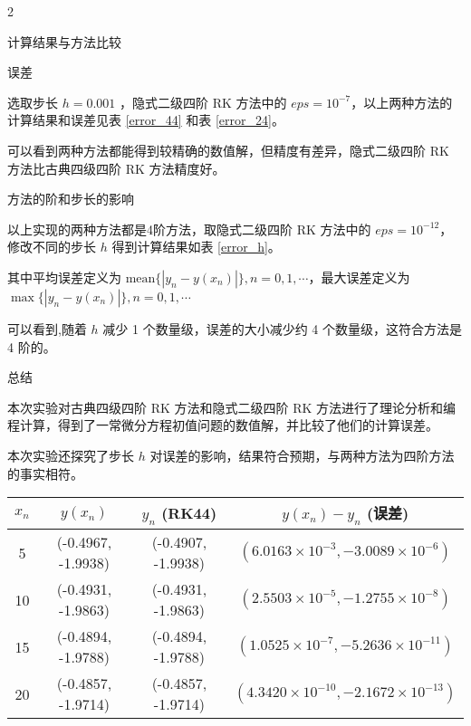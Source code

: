 \documentclass[a4paper]{article}
\begin{document}
\begin{multicols}{2}
\begin{section}{计算结果与方法比较}
	
	\begin{subsection}{误差}
	
		选取步长 $h=0.001$ ，隐式二级四阶 RK 方法中的 $eps = 10^{-7}$，以上两种方法的计算结果和误差见表 \ref{error_44} 和表 \ref{error_24}。
		
		可以看到两种方法都能得到较精确的数值解，但精度有差异，隐式二级四阶 RK 方法比古典四级四阶 RK 方法精度好。
		
	\end{subsection}

	\begin{subsection}{方法的阶和步长的影响}
		
		以上实现的两种方法都是4阶方法，取隐式二级四阶 RK 方法中的 $eps = 10^{-12}$，修改不同的步长 $h$ 得到计算结果如表 \ref{error_h}。
		
		其中平均误差定义为 $\text{mean}\{|y_n - y(x_n)|\}, {n = 0,1,\cdots}$，最大误差定义为 $\max\{|y_n - y(x_n)|\}, {n = 0,1,\cdots}$
		
		可以看到,随着 $h$ 减少 1 个数量级，误差的大小减少约 4 个数量级，这符合方法是 4 阶的。
		
	\end{subsection}
	
\end{section}
	
\begin{section}{总结}

	本次实验对古典四级四阶 RK 方法和隐式二级四阶 RK 方法进行了理论分析和编程计算，得到了一常微分方程初值问题的数值解，并比较了他们的计算误差。
	
	本次实验还探究了步长 $h$ 对误差的影响，结果符合预期，与两种方法为四阶方法的事实相符。
	
\end{section}

\end{multicols}

\begin{table*}[ht]
	\centering
	\caption{古典四级四阶 Runge-Kutta 方法的计算结果和误差}
	\label{error_44}
	\begin{tabular}{c|c|cc}
	\hline
	$x_n$ & $y(x_n)$           & $y_n$ (RK44)       & $y(x_n)-y_n $ (误差)   \\ \hline
	5     & (-0.4967, -1.9938) & (-0.4907, -1.9938) & $(6.0163\times 10^{-3}, -3.0089\times 10^{-6})$\\
	10    & (-0.4931, -1.9863) & (-0.4931, -1.9863) & $(2.5503\times 10^{-5}, -1.2755\times 10^{-8})$\\
	15    & (-0.4894, -1.9788) & (-0.4894, -1.9788) & $(1.0525\times 10^{-7}, -5.2636\times 10^{-11})$\\
	20    & (-0.4857, -1.9714) & (-0.4857, -1.9714) & $(4.3420\times 10^{-10}, -2.1672\times 10^{-13})$
	\\ \hline
	\end{tabular}
\end{table*}
\end{document}
